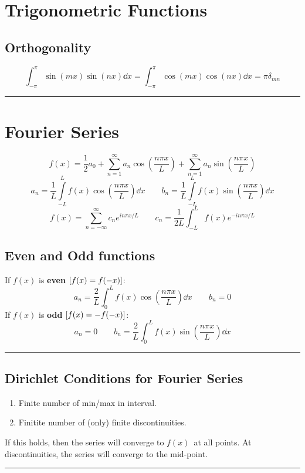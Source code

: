 \documentclass[10pt,a4paper]{article}
\renewcommand{\b}{\textbf}
\renewcommand{\exp}{e^}
\newcommand{\oneinfsum}{\sum_{n=1}^{\infty}}
\newcommand{\holine}{\rule{286pt}{1pt}}
\newcommand{\half}{\frac{1}{2}}
\begin{document}
\begin{multicols}{2}
\newpage

\section*{Trigonometric Functions}
\subsection*{Orthogonality}
\[
    \int_{-\pi}^\pi \sin(mx)\sin(nx) \dd{x} = \int_{-\pi}^\pi \cos(mx)\cos(nx) \dd{x} = \pi \delta_{mn}
\]


\holine
\section*{Fourier Series}
\[
    f(x) = \half a_0 + \oneinfsum a_n\cos(\frac{n\pi x}{L}) + \oneinfsum a_n\sin(\frac{n\pi x}{L})
\]
\[
    a_n = \frac{1}{L}\int\limits_{-L}^{L}f(x) \cos(\frac{n\pi x}{L}) \dd{x} \quad\quad
    b_n = \frac{1}{L}\int\limits_{-L}^{L}f(x) \sin(\frac{n\pi x}{L}) \dd{x}
\]
\[
    f(x) = \sum_{n=-\infty}^{\infty} c_n \exp{in\pi x/L}  \quad\quad
    c_n = \frac{1}{2L}\int_{-L}^L f(x) \exp{-in\pi x/L}
\]

\subsection*{Even and Odd functions}
If $f(x)$ is \b{even} $\qty[f(x) = f(-x)]$:
\[
    a_n = \frac{2}{L}\int_0^L f(x)\cos(\frac{n\pi x}{L}) \dd{x} \quad\quad b_n = 0
\]
If $f(x)$ is \b{odd} $\qty[f(x) = -f(-x)]$:
\[
    a_n = 0 \quad\quad b_n = \frac{2}{L}\int_0^L f(x)\sin(\frac{n\pi x}{L}) \dd{x}
\]


\holine 
\subsection*{Dirichlet Conditions for Fourier Series}
\begin{enumerate}
    \item Finite number of min/max in interval.
    \item Finitite number of (only) finite discontinuities.
\end{enumerate}
If this holds, then the series will converge to $f(x)$ at all points. At discontinuities, the series will converge to the mid-point.
\holine

\end{multicols}
\end{document}
